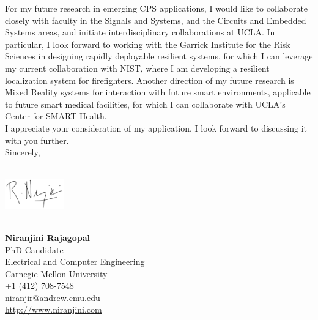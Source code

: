 \documentclass[10pt]{article}
\begin{document}
For my future research in emerging CPS applications, I would like to collaborate closely with faculty in the Signals and Systems, and the Circuits and Embedded Systems areas, and initiate interdisciplinary collaborations at UCLA. In particular, I look forward to working with the Garrick Institute for the Risk Sciences in designing rapidly deployable resilient systems, for which I can leverage my current collaboration with NIST, where I am developing a resilient localization system for firefighters. Another direction of my future research is Mixed Reality systems for interaction with future smart environments, applicable to future smart medical facilities, for which I can collaborate with UCLA's Center for SMART Health. \\%


I appreciate your consideration of my application. I look forward to discussing it with you further. \\

Sincerely,\\\\
\begin{minipage}[t!]{\textwidth}
\includegraphics[width=1in]{Sign.png}%
\end{minipage}\\

\textbf{Niranjini Rajagopal}\\
PhD Candidate\\
Electrical and Computer Engineering\\
Carnegie Mellon University\\
+1 (412) 708-7548 \\%
\href{mailto:niranjir@andrew.cmu.edu}{niranjir@andrew.cmu.edu}\\%
\href{http://www.niranjini.com}{http://www.niranjini.com} 

\end{document}
